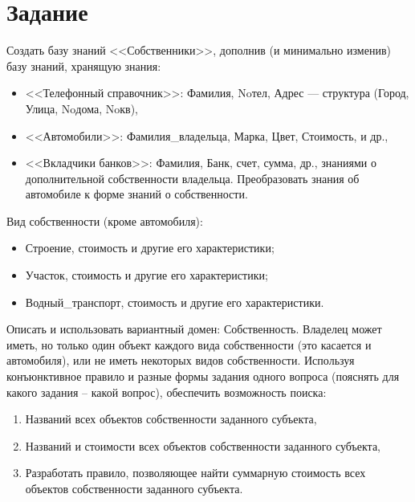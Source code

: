 \section*{Задание}

Создать базу знаний <<Собственники>>, дополнив (и минимально изменив) базу
знаний, хранящую знания:
\begin{itemize}
    \item <<Телефонный справочник>>: Фамилия, Noтел, Адрес --- структура (Город,
          Улица, Noдома, Noкв),
    \item <<Автомобили>>: Фамилия\_владельца, Марка, Цвет, Стоимость, и др.,
    \item <<Вкладчики банков>>: Фамилия, Банк, счет, сумма, др., знаниями
          о дополнительной собственности владельца. Преобразовать знания об
          автомобиле к форме знаний о собственности.
\end{itemize}
Вид собственности (кроме автомобиля):
\begin{itemize}
    \item Строение, стоимость и другие его характеристики;
    \item Участок, стоимость и другие его характеристики;
    \item Водный\_транспорт, стоимость и другие его характеристики.
\end{itemize}
Описать и использовать вариантный домен: Собственность. Владелец может иметь, но
только один объект каждого вида собственности (это касается и автомобиля), или не
иметь некоторых видов собственности.
Используя конъюнктивное правило и разные формы задания одного вопроса (пояснять
для какого задания – какой вопрос),
обеспечить возможность поиска:
\begin{enumerate}
    \item Названий всех объектов собственности заданного субъекта,
    \item Названий и стоимости всех объектов собственности заданного субъекта,
    \item Разработать правило, позволяющее найти суммарную стоимость всех
          объектов собственности заданного субъекта.
\end{enumerate}




